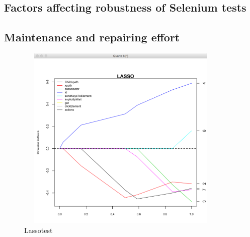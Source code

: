 \subsection{Factors affecting robustness of Selenium tests}
\label{robustnessFactors}
\subsection{Maintenance and repairing effort}
\label{locatorMaintenance}

\begin{figure}
\makeatletter 
\renewcommand{\thefigure}{\@arabic\c@figure}
\makeatother
    \centering
  \includegraphics[width=4in,height=3.5in]{./Figures/lassotest.png}
  \caption{Lassotest}
  \label{fig:lassotest} 
\end{figure}

